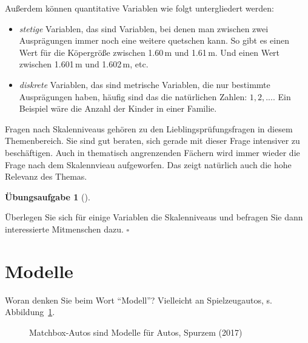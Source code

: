 \documentclass[
  letterpaper,
  oneside,
  open=any]{scrbook}
\providecommand{\tightlist}{%
  \setlength{\itemsep}{0pt}\setlength{\parskip}{0pt}}\usepackage{longtable,booktabs,array}
\theoremstyle{definition}
\newtheorem{exercise}{Übungsaufgabe}[chapter]
\theoremstyle{definition}
\theoremstyle{definition}
\theoremstyle{remark}
\begin{document}
Außerdem können quantitative Variablen wie folgt untergliedert werden:

\begin{itemize}
\tightlist
\item
  \emph{stetige} Variablen, das sind Variablen, bei denen man zwischen
  zwei Ausprägungen immer noch eine weitere quetschen kann. So gibt es
  einen Wert für die Köpergröße zwischen 1.60\,m und 1.61\,m. Und einen
  Wert zwischen 1.601\,m und 1.602\,m, etc.
\item
  \emph{diskrete} Variablen, das sind metrische Variablen, die nur
  bestimmte Ausprägungen haben, häufig sind das die natürlichen Zahlen:
  \(1,2,...\). Ein Beispiel wäre die Anzahl der Kinder in einer Familie.
\end{itemize}

Fragen nach Skalenniveaus gehören zu den Lieblingsprüfungsfragen in
diesem Themenbereich. Sie sind gut beraten, sich gerade mit dieser Frage
intensiver zu beschäftigen. Auch in thematisch angrenzenden Fächern wird
immer wieder die Frage nach dem Skalennvieau aufgeworfen. Das zeigt
natürlich auch die hohe Relevanz des Themas.

\begin{exercise}[]\protect\hypertarget{exr-skalenniveaus}{}\label{exr-skalenniveaus}

Überlegen Sie sich für einige Variablen die Skalenniveaus und befragen
Sie dann interessierte Mitmenschen dazu. \(\square\)

\end{exercise}

\section{Modelle}\label{modelle}

Woran denken Sie beim Wort \enquote{Modell}? Vielleicht an
Spielzeugautos, s. Abbildung~\ref{fig-matchbox}.

\begin{figure}


\caption{\label{fig-matchbox}Matchbox-Autos sind Modelle für Autos,
Spurzem (2017)}

\end{figure}%
\end{document}
